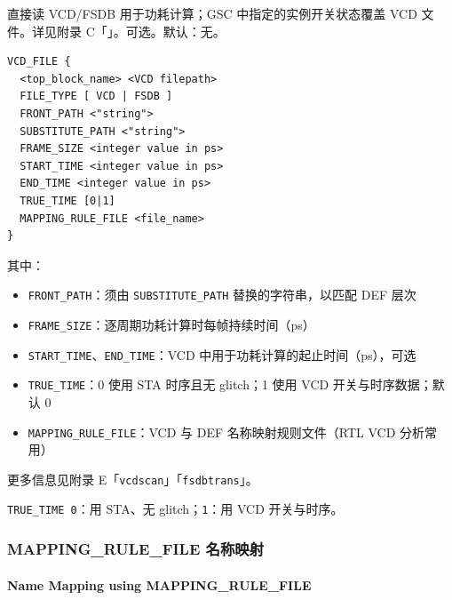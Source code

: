  直接读 VCD/FSDB 用于功耗计算；GSC 中指定的实例开关状态覆盖 VCD 文件。详见附录 C「」。可选。默认：无。
\begin{lstlisting}
VCD_FILE {
  <top_block_name> <VCD filepath>
  FILE_TYPE [ VCD | FSDB ]
  FRONT_PATH <"string">
  SUBSTITUTE_PATH <"string">
  FRAME_SIZE <integer value in ps>
  START_TIME <integer value in ps>
  END_TIME <integer value in ps>
  TRUE_TIME [0|1]
  MAPPING_RULE_FILE <file_name>
}
\end{lstlisting}
其中：
\begin{itemize}
  \item \texttt{FRONT_PATH}：须由 \texttt{SUBSTITUTE_PATH} 替换的字符串，以匹配 DEF 层次
  \item \texttt{FRAME_SIZE}：逐周期功耗计算时每帧持续时间（ps）
  \item \texttt{START_TIME}、\texttt{END_TIME}：VCD 中用于功耗计算的起止时间（ps），可选
  \item \texttt{TRUE_TIME}：0 使用 STA 时序且无 glitch；1 使用 VCD 开关与时序数据；默认 0
  \item \texttt{MAPPING_RULE_FILE}：VCD 与 DEF 名称映射规则文件（RTL VCD 分析常用）
\end{itemize}
更多信息见附录 E「\texttt{vcdscan}」「\texttt{fsdbtrans}」。

\texttt{TRUE\_TIME 0}：用 STA、无 glitch；\texttt{1}：用 VCD 开关与时序。

\subsubsection{MAPPING\_RULE\_FILE 名称映射}
\paragraph*{Name Mapping using MAPPING\_RULE\_FILE}

